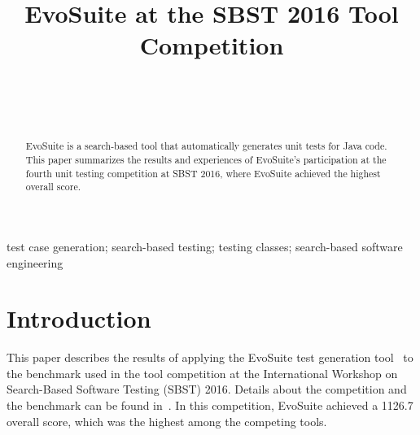 \documentclass[10pt,conference,compsocconf]{IEEEtran}
\newcommand{\EVOSUITE}{{\sc EvoSuite}\xspace}
\begin{document}
\title{EvoSuite at the SBST 2016 Tool Competition}

\author{
\\
\and
{}
\\
}

\maketitle

\begin{abstract}
  \EVOSUITE is a search-based tool that automatically
  generates unit tests for Java code.  This paper summarizes the
  results and experiences of \EVOSUITE's participation at the fourth
  unit testing competition at SBST 2016, where \EVOSUITE achieved the
  highest overall score. 
\end{abstract}

\begin{IEEEkeywords}
  test case generation; search-based testing; testing classes;
  search-based software engineering
\end{IEEEkeywords}


\section{Introduction}

This paper describes the results of applying the \EVOSUITE test
generation tool~\cite{FrA11c} to the benchmark used in the tool
competition at the International Workshop on Search-Based Software
Testing (SBST) 2016.  Details about the competition and the benchmark
can be found in~\cite{sbst16competition}. 
In this competition, \EVOSUITE achieved a 1126.7 overall score, which was the highest among
the competing tools. 
\end{document}
